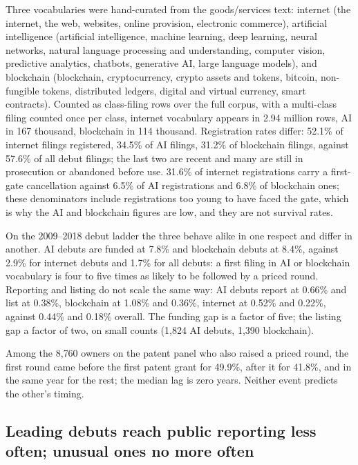 Three vocabularies were hand-curated from the goods/services text:
internet (the internet, the web, websites, online provision, electronic
commerce), artificial intelligence (artificial intelligence, machine
learning, deep learning, neural networks, natural language processing and
understanding, computer vision, predictive analytics, chatbots, generative
AI, large language models), and
blockchain (blockchain, cryptocurrency, crypto assets and tokens, bitcoin,
non-fungible tokens, distributed ledgers, digital and virtual currency,
smart contracts). Counted as class-filing rows over the full corpus, with a
multi-class filing counted once per class, internet vocabulary appears in
2.94 million rows, AI in 167 thousand, blockchain in 114 thousand.
Registration rates differ: 52.1\% of internet filings registered, 34.5\% of
AI filings, 31.2\% of blockchain filings, against 57.6\% of all debut
filings; the last two are recent and many are still in prosecution or
abandoned before use. 31.6\% of internet registrations carry a first-gate cancellation against
6.5\% of AI registrations and 6.8\% of blockchain ones; these denominators
include registrations too young to have faced the gate, which is why the AI
and blockchain figures are low, and they are not survival rates.

On the 2009--2018 debut ladder the three behave alike in one respect and
differ in another. AI debuts are funded at 7.8\% and blockchain debuts at
8.4\%, against 2.9\% for internet debuts and 1.7\% for all debuts: a first
filing in AI or blockchain vocabulary is four to five times as likely to be
followed by a priced round. Reporting and listing do not scale the same
way: AI debuts report at 0.66\% and list at 0.38\%, blockchain at 1.08\% and
0.36\%, internet at 0.52\% and 0.22\%, against 0.44\% and 0.18\% overall.
The funding gap is a factor of five; the listing gap a factor of two, on
small counts (1{,}824 AI debuts, 1{,}390 blockchain).

Among the 8{,}760 owners on
the patent panel who also raised a priced round, the first round came
before the first patent grant for 49.9\%, after it for 41.8\%, and in the
same year for the rest; the median lag is zero years. Neither event
predicts the other's timing.


\subsection{Leading debuts reach public reporting less often; unusual ones no more often}\label{sec:bluesea}

